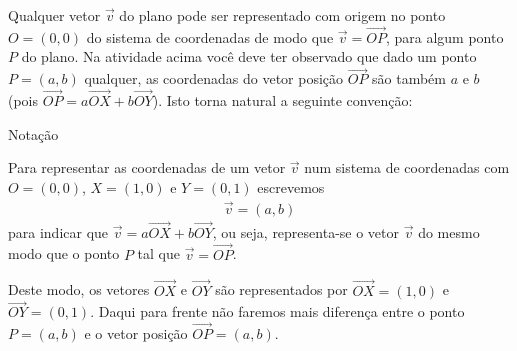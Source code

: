 Qualquer vetor \(\vec{v}\) do plano pode ser representado com origem no ponto \(O=(0,0)\) do sistema de coordenadas de modo que \(\vec{v}=\overrightarrow{OP}\), para algum ponto \(P\) do plano.  Na atividade acima você deve ter observado que dado um ponto \(P=(a,b)\) qualquer, as coordenadas do vetor posição \(\overrightarrow{OP}\) são também \(a\) e \(b\) (pois \(\overrightarrow{OP} = a\overrightarrow{OX} + b\overrightarrow{OY}\)). Isto torna natural a seguinte convenção:

\begin{observationtitle}{Notação}

Para representar as coordenadas de um vetor \(\vec{v}\) num sistema de coordenadas com \(O=(0,0)\), \(X=(1,0)\) e \(Y=(0,1)\) escrevemos
\begin{equation*}
\begin{split}\vec{v} = (a,b)\end{split}
\end{equation*}
para indicar que \(\vec{v} = a\overrightarrow{OX} + b\overrightarrow{OY}\), ou seja, representa-se o vetor \(\vec{v}\) do mesmo modo que o ponto \(P\) tal que \(\vec{v}=\overrightarrow{OP}\).
\end{observationtitle}

Deste modo, os vetores \(\overrightarrow{OX}\) e \(\overrightarrow{OY}\) são representados por \(\overrightarrow{OX}=(1,0)\) e \(\overrightarrow{OY}=(0,1)\).
Daqui para frente não faremos mais diferença entre o ponto \(P=(a,b)\) e o vetor posição \(\overrightarrow{OP}=(a,b)\).

